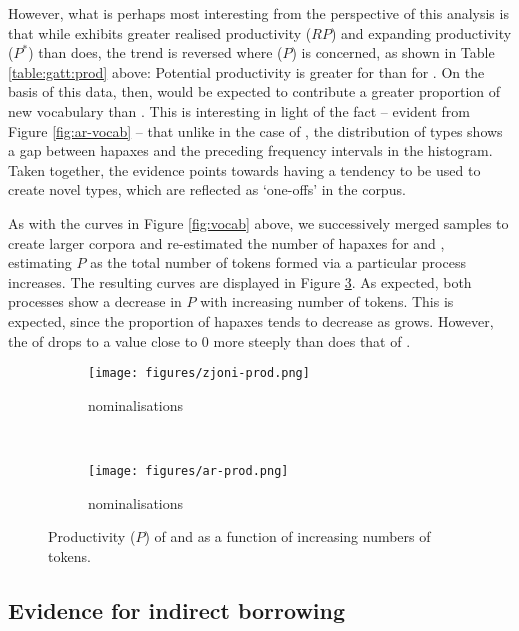 \documentclass[output=paper]{LSP/langsci}
\begin{document}
However, what is perhaps most interesting from the perspective of this analysis is that while {\zjoni} exhibits greater realised productivity ($RP$) and expanding productivity ($P^{*}$) than {\ar} does, the trend is reversed where  ($P$) is concerned, as shown in Table \ref{table:gatt:prod} above: Potential productivity is greater for {\ar} than for \zjoni. On the basis of this data, then, {\ar} would be expected to contribute a greater proportion of new vocabulary than \zjoni. This is interesting in light of the fact -- evident from Figure \ref{fig:ar-vocab} -- that unlike in the case of \zjoni, the distribution of {\ar} types shows a gap between hapaxes and the preceding frequency intervals in the histogram. Taken together, the evidence points towards {\ar} having a tendency to be used to create novel types, which are reflected as `one-offs' in the corpus.

\largerpage
As with the  curves in Figure \ref{fig:vocab} above, we successively merged samples to create larger corpora and re-estimated the number of hapaxes for {\ar} and \zjoni, estimating $P$ as the total number of tokens formed via a particular process increases. The resulting curves are displayed in Figure \ref{fig:prod}. As expected, both processes show a decrease in $P$ with increasing number of tokens. This is expected, since the proportion of hapaxes tends to decrease as  grows. However, the  of {\zjoni} drops to a value close to 0 more steeply than does that of \ar.

\begin{figure}[t]
%
\begin{subfigure}[b]{0.45\textwidth} 
	
	\texttt{[image: figures/zjoni-prod.png]}
	\caption{{\zjoni} nominalisations}
	\label{fig:zjoni-prod}
\end{subfigure}
%
~
\begin{subfigure}[b]{0.45\textwidth} 
	
	\texttt{[image: figures/ar-prod.png]}
	\caption{{\ar} nominalisations}
	\label{fig:ar-prod}
\end{subfigure}
%
\caption{Productivity ($P$) of {\ar} and {\zjoni} as a function of increasing numbers of tokens.}
\label{fig:prod}
\end{figure}


\subsection{Evidence for indirect borrowing}
\end{document}
